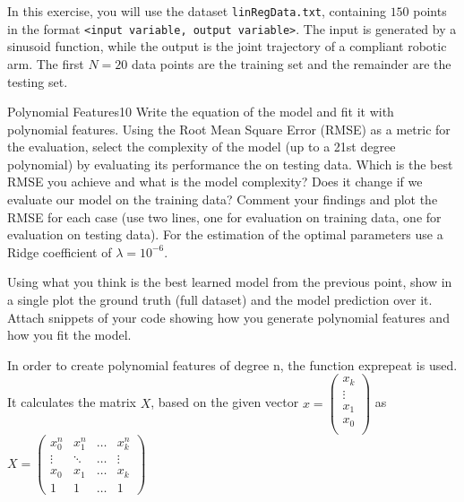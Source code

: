 \newif\ifvimbug
\vimbugfalse

\ifvimbug

\fi


In this exercise, you will use the dataset \texttt{linRegData.txt}, containing $150$ points in the format \texttt{<input variable, output variable>}. The input is generated by a sinusoid function, while the output is the joint trajectory of a compliant robotic arm. 
The first $N=20$ data points are the training set and the remainder are the testing set.

\begin{questions}


\begin{question}{Polynomial Features}{10}
Write the equation of the model and fit it with polynomial features. Using the Root Mean Square Error (RMSE) as a metric for the evaluation, select the complexity of the model (up to a 21st degree polynomial) by evaluating its performance the on testing data. Which is the best RMSE you achieve and what is the model complexity? Does it change if we evaluate our model on the training data? Comment your findings and plot the RMSE for each case (use two lines, one for evaluation on training data, one for evaluation on testing data).
For the estimation of the optimal parameters use a Ridge coefficient of $\lambda=10^{-6}$.

Using what you think is the best learned model from the previous point, show in a single plot the ground truth (full dataset) and the model prediction over it.
Attach snippets of your code showing how you generate polynomial features and how you fit the model.


\begin{answer}
In order to create polynomial features of degree n, the function exprepeat is used. It calculates the matrix $X$, based on the given vector
$x = (\begin{matrix}
x_k\\
\vdots\\
x_1\\
x_0\\
\end{matrix})$ as 
$X = (
\begin{matrix*}
	x_0^n & x_1^n & \hdots & x_k^n\\
	\vdots & \ddots & \hdots & \vdots\\
	x_0 & x_1 & \hdots & x_k\\
	1 & 1 & \hdots & 1
\end{matrix*}
)$



\end{answer}
\end{question}
\end{questions}
